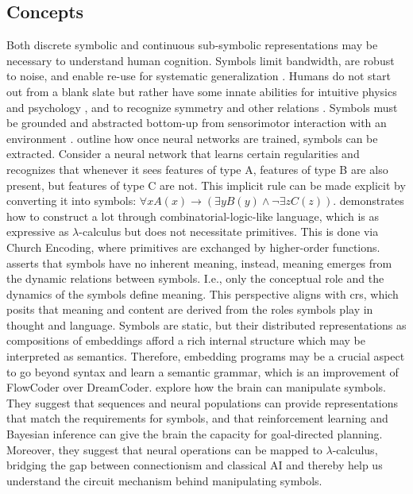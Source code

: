 \subsection{Concepts}
Both discrete symbolic and continuous sub-symbolic representations may be necessary to understand human cognition.
Symbols limit bandwidth, are robust to noise, and enable re-use for systematic generalization \cite{dehaeneSymbolsMentalPrograms2022, liuDiscreteValuedNeuralCommunication2021}.
Humans do not start out from a blank slate \cite{lakeBuildingMachinesThat2017, pinker2003blank} but rather have some innate abilities for intuitive physics and psychology \cite{ullmanMindGamesGame2017,ullmanTheoryLearningStochastic2012}, and to recognize symmetry and other relations \cite{dehaeneSymbolsMentalPrograms2022}.
Symbols must be grounded and abstracted bottom-up from sensorimotor interaction with an environment \cite{windridgeRepresentationalFluidityEmbodied2018}. 
\citet{garcezNeurosymbolicAI3rd2020} outline how once neural networks are trained, symbols can be extracted. Consider a neural network that learns certain regularities and recognizes that whenever it sees features of type A, features of type B are also present, but features of type C are not. This implicit rule can be made explicit by converting it into symbols: $\forall x A(x) \rightarrow (\exists y B(y) \land \lnot \exists z C(z))$.
\citet{piantadosiComputationalOriginRepresentation2021} demonstrates how to construct a \acrlong{lot} through combinatorial-logic-like language, which is as expressive as $\lambda$-calculus but does not necessitate primitives. This is done via Church Encoding, where primitives are exchanged by higher-order functions. 
\citet{piantadosiComputationalOriginRepresentation2021} asserts that symbols have no inherent meaning, instead, meaning emerges from the dynamic relations between symbols. I.e., only the conceptual role and the dynamics of the symbols define meaning. This perspective aligns with \acrlong{crs}, which posits that meaning and content are derived from the roles symbols play in thought and language. 
Symbols are static, but their distributed representations as compositions of embeddings afford a rich internal structure which may be interpreted as semantics. Therefore, embedding programs may be a crucial aspect to go beyond syntax and learn a semantic grammar, which is an improvement of FlowCoder over DreamCoder.
\citet{doNeuralCircuitsSymbolic2021} explore how the brain can manipulate symbols. They suggest that sequences and neural populations can provide representations that match the requirements for symbols, and that reinforcement learning and Bayesian inference can give the brain the capacity for goal-directed planning. Moreover, they suggest that neural operations can be mapped to $\lambda$-calculus, bridging the gap between connectionism and classical AI and thereby help us understand the circuit mechanism behind manipulating symbols.

